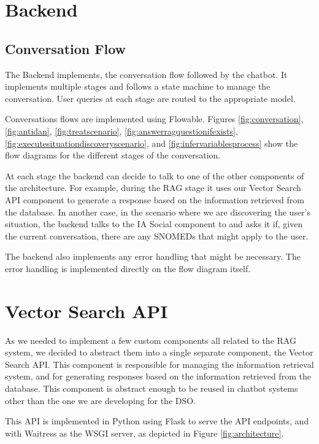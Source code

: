 \documentclass[a4paper,12pt,twoside]{ThesisStyle}
\begin{document}
\section{Backend}
\label{sec:backend}

\subsection{Conversation Flow}
\label{subsec:conversation_flow}

The Backend implements, the conversation flow followed by the chatbot. It implements multiple stages and follows a state machine to manage the conversation. User queries at each stage are routed to the appropriate model.

Conversations flows are implemented using Flowable. Figures \ref{fig:conversation}, \ref{fig:antidan}, \ref{fig:treatscenario}, \ref{fig:answerragquestionifexists}, \ref{fig:executesituationdiscoveryscenario}, and \ref{fig:infervariablesprocess} show the flow diagrams for the different stages of the conversation.

At each stage the backend can decide to talk to one of the other components of the architecture. For example, during the RAG stage it uses our Vector Search API component to generate a response based on the information retrieved from the database. In another case, in the scenario where we are discovering the user's situation, the backend talks to the IA Social component to and asks it if, given the current conversation, there are any SNOMEDs that might apply to the user.

The backend also implements any error handling that might be necessary. The error handling is implemented directly on the flow diagram itself.

\section{Vector Search API}
\label{sec:vector_search_api}

As we needed to implement a few custom components all related to the RAG system, we decided to abstract them into a single separate component, the Vector Search API. This component is responsible for managing the information retrieval system, and for generating responses based on the information retrieved from the database. This component is abstract enough to be reused in chatbot systems other than the one we are developing for the DSO.

This API is implemented in Python using Flask to serve the API endpoints, and with Waitress as the WSGI server, as depicted in Figure \ref{fig:architecture}.
\end{document}
